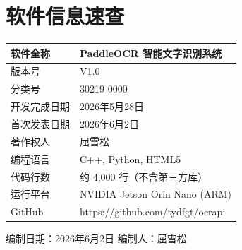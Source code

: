 \documentclass[12pt,a4paper]{ctexart}
\begin{document}
\section*{软件信息速查}

\begin{longtable}{|p{4cm}|p{9cm}|}
\hline
软件全称 & PaddleOCR 智能文字识别系统 \\\hline
版本号 & V1.0 \\\hline
分类号 & 30219-0000 \\\hline
开发完成日期 & 2026年5月28日 \\\hline
首次发表日期 & 2026年6月2日 \\\hline
著作权人 & 屈雪松 \\\hline
编程语言 & C++, Python, HTML5 \\\hline
代码行数 & 约 4,000 行（不含第三方库） \\\hline
运行平台 & NVIDIA Jetson Orin Nano (ARM) \\\hline
GitHub & https://github.com/tydfgt/ocrapi \\\hline
\end{longtable}

\begin{center}
\vspace{1cm}
编制日期：2026年6月2日 \quad 编制人：屈雪松
\end{center}
\end{document}

